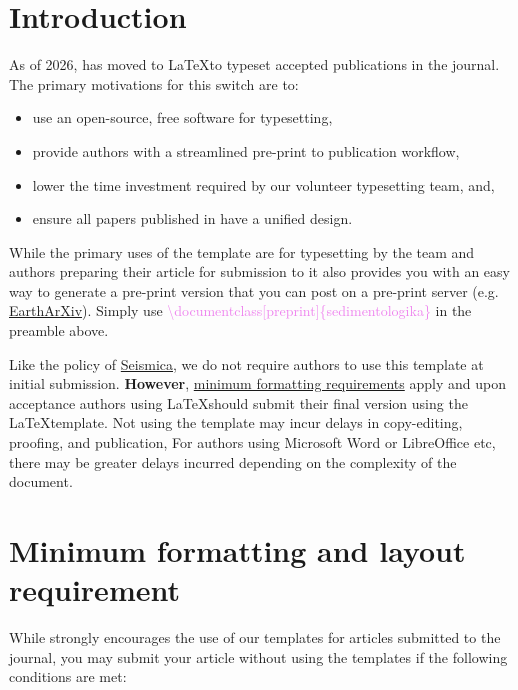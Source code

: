 \documentclass[submission, anonymous]{sedimentologika}
\begin{document}
\section{Introduction}
As of 2026, \Sedimentologika\space has moved to \LaTeX\space to typeset accepted publications in the journal.
The primary motivations for this switch are to:
\begin{itemize}
    \RaggedRight
  \item use an open-source, free software for typesetting,
  \item provide authors with a streamlined pre-print to publication workflow,
  \item lower the time investment required by our volunteer typesetting team, and,
  \item ensure all papers published in \Sedimentologika\space have a unified design.
    \justifying
\end{itemize}

While the primary uses of the template are for typesetting by the \Sedimentologika\space team and authors preparing their article for submission to \Sedimentologika\space it also provides you with an easy way to generate a pre-print version that you can post on a pre-print server (e.g. \href{https://eartharxiv.org/}{EarthArXiv}).
Simply use \textcolor{violet}{\textbackslash documentclass[preprint]\{sedimentologika\}} in the preamble above.

Like the policy of \href{https://seismica.library.mcgill.ca/author-guidelines#manuscript-preparation}{Seismica}, we do not require authors to use this template at initial submission.
\textbf{However}, \href{https://sedimentologika.org/manuscript-guidelines}{minimum formatting requirements} apply and upon acceptance authors using \LaTeX\space should submit their final version using the \Sedimentologika\space \LaTeX\space template.
Not using the template may incur delays in copy-editing, proofing, and publication,
For authors using Microsoft Word or LibreOffice etc, there may be greater delays incurred depending on the complexity of the document.

\section{Minimum formatting and layout requirement}

While \Sedimentologika\space strongly encourages the use of our templates for articles submitted to the journal, you may submit your article without using the templates if the following conditions are met:
\end{document}
